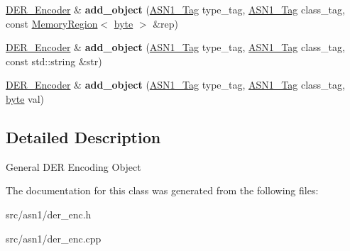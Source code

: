 \begin{DoxyCompactItemize}
\item 
\hypertarget{classBotan_1_1DER__Encoder_a11844805fcc6a11fe2dffb8da444541f}{\hyperlink{classBotan_1_1DER__Encoder}{D\-E\-R\-\_\-\-Encoder} \& {\bfseries add\-\_\-object} (\hyperlink{namespaceBotan_aaa08f67a945ef195fa39e62659dffa7a}{A\-S\-N1\-\_\-\-Tag} type\-\_\-tag, \hyperlink{namespaceBotan_aaa08f67a945ef195fa39e62659dffa7a}{A\-S\-N1\-\_\-\-Tag} class\-\_\-tag, const \hyperlink{classBotan_1_1MemoryRegion}{Memory\-Region}$<$ \hyperlink{namespaceBotan_a7d793989d801281df48c6b19616b8b84}{byte} $>$ \&rep)}\label{classBotan_1_1DER__Encoder_a11844805fcc6a11fe2dffb8da444541f}

\item 
\hypertarget{classBotan_1_1DER__Encoder_a90fbd8d75ae339493f53da4689ef9c1a}{\hyperlink{classBotan_1_1DER__Encoder}{D\-E\-R\-\_\-\-Encoder} \& {\bfseries add\-\_\-object} (\hyperlink{namespaceBotan_aaa08f67a945ef195fa39e62659dffa7a}{A\-S\-N1\-\_\-\-Tag} type\-\_\-tag, \hyperlink{namespaceBotan_aaa08f67a945ef195fa39e62659dffa7a}{A\-S\-N1\-\_\-\-Tag} class\-\_\-tag, const std\-::string \&str)}\label{classBotan_1_1DER__Encoder_a90fbd8d75ae339493f53da4689ef9c1a}

\item 
\hypertarget{classBotan_1_1DER__Encoder_a6f46f6b3433cb637d866b110ea0acb52}{\hyperlink{classBotan_1_1DER__Encoder}{D\-E\-R\-\_\-\-Encoder} \& {\bfseries add\-\_\-object} (\hyperlink{namespaceBotan_aaa08f67a945ef195fa39e62659dffa7a}{A\-S\-N1\-\_\-\-Tag} type\-\_\-tag, \hyperlink{namespaceBotan_aaa08f67a945ef195fa39e62659dffa7a}{A\-S\-N1\-\_\-\-Tag} class\-\_\-tag, \hyperlink{namespaceBotan_a7d793989d801281df48c6b19616b8b84}{byte} val)}\label{classBotan_1_1DER__Encoder_a6f46f6b3433cb637d866b110ea0acb52}

\end{DoxyCompactItemize}


\subsection{Detailed Description}
General D\-E\-R Encoding Object 

The documentation for this class was generated from the following files\-:\begin{DoxyCompactItemize}
\item 
src/asn1/der\-\_\-enc.\-h\item 
src/asn1/der\-\_\-enc.\-cpp\end{DoxyCompactItemize}
